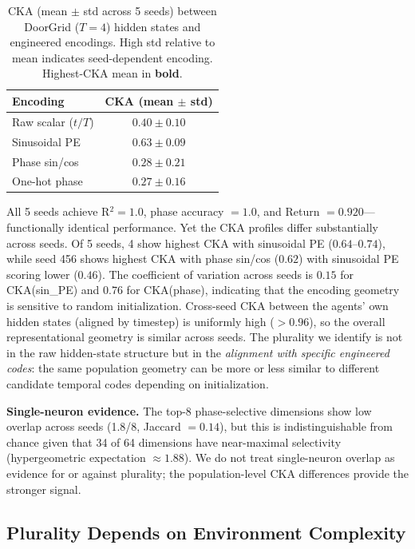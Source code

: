 \documentclass{article}
\begin{document}
\begin{table}[t]
\centering
\caption{CKA (mean $\pm$ std across 5 seeds) between DoorGrid ($T = 4$) hidden states and engineered encodings. High std relative to mean indicates seed-dependent encoding. Highest-CKA mean in \textbf{bold}.}
\label{tab:cka}
\begin{tabular}{lc}
\toprule
\textbf{Encoding} & \textbf{CKA (mean $\pm$ std)} \\
\midrule
Raw scalar ($t/T$) & $0.40 \pm 0.10$ \\
Sinusoidal PE      & $\mathbf{0.63 \pm 0.09}$ \\
Phase sin/cos      & $0.28 \pm 0.21$ \\
One-hot phase      & $0.27 \pm 0.16$ \\
\bottomrule
\end{tabular}
\end{table}

All 5 seeds achieve R$^2 = 1.0$, phase accuracy $= 1.0$, and Return $= 0.920$---functionally identical performance.
Yet the CKA profiles differ substantially across seeds.
Of 5 seeds, 4 show highest CKA with sinusoidal PE ($0.64$--$0.74$), while seed 456 shows highest CKA with phase sin/cos ($0.62$) with sinusoidal PE scoring lower ($0.46$).
The coefficient of variation across seeds is $0.15$ for CKA(sin\_PE) and $0.76$ for CKA(phase), indicating that the encoding geometry is sensitive to random initialization.
Cross-seed CKA between the agents' own hidden states (aligned by timestep) is uniformly high ($> 0.96$), so the overall representational geometry is similar across seeds.
The plurality we identify is not in the raw hidden-state structure but in the \emph{alignment with specific engineered codes}: the same population geometry can be more or less similar to different candidate temporal codes depending on initialization.

\textbf{Single-neuron evidence.}
The top-8 phase-selective dimensions show low overlap across seeds (1.8/8, Jaccard $= 0.14$), but this is indistinguishable from chance given that 34 of 64 dimensions have near-maximal selectivity (hypergeometric expectation $\approx 1.88$).
We do not treat single-neuron overlap as evidence for or against plurality; the population-level CKA differences provide the stronger signal.

\subsection{Plurality Depends on Environment Complexity}
\label{sec:cyclic}
\end{document}

